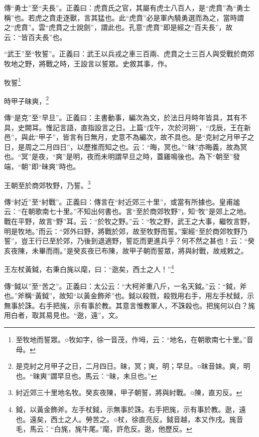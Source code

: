 {\noindent\zhuan{}\fzbyks 傳“勇士”至“夫長”。正義曰：虎賁氏之官，其屬有虎士八百人，是“虎賁”為“勇士稱”也。若虎之賁走逐獸，言其猛也。此“虎賁”必是軍內驍勇選而為之，當時謂之“虎賁”。雲“虎賁之士說劍”，謂此也。孔意“虎賁”即是經之“百夫長”，故云：“皆百夫長”也。 \par}

{\noindent\shu{}\fzkt “武王”至“牧誓”。正義曰：武王以兵戎之車三百兩、虎賁之士三百人與受戰於商郊牧地之野，將戰之時，王設言以誓眾。史敘其事，作。 \par}

牧誓\footnote{至牧地而誓眾。○牧如字，徐一音茂，作坶，云：“地名，在朝歌南七十里。”音母。}

時甲子昧爽，\footnote{是克紂之月甲子之日，二月四日。昧，冥；爽，明；早旦。○昧音妹。爽，明也。“昧爽”謂早旦也。馬云：“昧，未旦也。”}

{\noindent\zhuan{}\fzbyks 傳“是克”至“早旦”。正義曰：主書動事，編次為文，於法日月時年皆具，其有不具，史闕耳。惟記言語，直指設言之日。上篇“戊午，次於河朔”，“戊辰，王在新邑”，與此“甲子”，皆言有日無月，史意不為編次，故不具也。是“克紂之月甲子之日，是周之二月四日”，以歷推而知之也。云：“晦，冥也。”“昧”亦晦義，故為冥也。“冥”是夜，“爽”是明，夜而未明謂早旦之時，蓋雞鳴後也。為下“朝至”發端，“朝”即“昧爽”時也。 \par}

王朝至於商郊牧野，乃誓。\footnote{紂近郊三十里地名牧。癸亥夜陳，甲子朝誓，將與紂戰。○陳，直刃反。}

{\noindent\zhuan{}\fzbyks 傳“紂近”至“紂戰”。正義曰：傳言在“紂近郊三十里”，或當有所據也。皇甫謐云：“在朝歌南七十里。”不知出何書也。言“至於商郊牧野”，知“牧”是郊上之地。戰在平野，故言“野”耳。云：“於牧之野。”云：“牧之野，武王之大事，繼牧言野，明是牧地。”而云：“郊外曰野，將戰於郊，故至牧野而誓。”案經“至於商郊牧野乃誓”，豈王行已至於郊，乃後到退適野，誓訖而更進兵乎？何不然之甚也！云：“癸亥夜陳，未畢而雨。”是癸亥夜已布陳，故甲子朝而誓眾，將與紂戰，故戒敕之。 \par}

王左杖黃鉞，右秉白旄以麾，曰：“逖矣，西土之人！”\footnote{鉞，以黃金飾斧。左手杖鉞，示無事於誅。右手把旄，示有事於教。逖，遠也。遠矣，西土之人。勞苦之。○杖，徐直亮反。鉞音越，本又作戌。旄音毛，馬云：“白旄，旄牛尾。”麾，許危反。逖，他歷反。}

{\noindent\zhuan{}\fzbyks 傳“鉞以”至“苦之”。正義曰：太公云：“大柯斧重八斤，一名天鉞。”云：“鉞，斧也。”斧稱“黃鉞”，故知“以黃金飾斧”也。鉞以殺戮，殺戮用右手，用左手杖鉞，示無事於誅。右手把旄，示有事於教。其意言惟教軍人，不誅殺也。把旄何以白？旄用白者，取其易見也。“逖，遠”，文。 \par}

